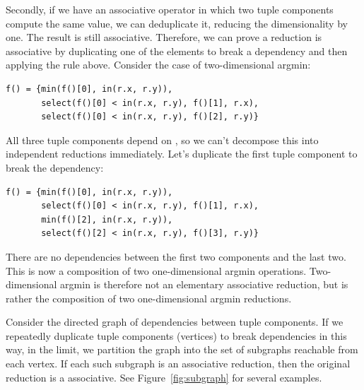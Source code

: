 

Secondly, if we have an associative operator in which two tuple components compute the same value, we can deduplicate it, reducing the dimensionality by one. The result is still associative. Therefore, we can prove a reduction is associative by duplicating one of the elements to break a dependency and then applying the rule above. Consider the case of two-dimensional argmin:

\begin{lstlisting}[caption={Two-dimensional argmin. The three tuple components are the minimum value, and its x and y coordinates.}]
f() = {min(f()[0], in(r.x, r.y)),
       select(f()[0] < in(r.x, r.y), f()[1], r.x),
       select(f()[0] < in(r.x, r.y), f()[2], r.y)}
\end{lstlisting}

All three tuple components depend on , so we can't decompose this into independent reductions immediately. Let's duplicate the first tuple component to break the dependency:

\begin{lstlisting}[caption={Two-dimensional argmin with the value redundantly computed}]
f() = {min(f()[0], in(r.x, r.y)),
       select(f()[0] < in(r.x, r.y), f()[1], r.x),
       min(f()[2], in(r.x, r.y)),
       select(f()[2] < in(r.x, r.y), f()[3], r.y)}
\end{lstlisting}

There are no dependencies between the first two components and the last two. This is now a composition of two one-dimensional argmin operations. Two-dimensional argmin is therefore not an elementary associative reduction, but is rather the composition of two one-dimensional argmin reductions.

Consider the directed graph of dependencies between tuple components. If we repeatedly duplicate tuple components (vertices) to break dependencies in this way, in the limit, we partition the graph into the set of subgraphs reachable from each vertex. If each such subgraph is an associative reduction, then the original reduction is a associative. See Figure~\ref{fig:subgraph} for several examples.


